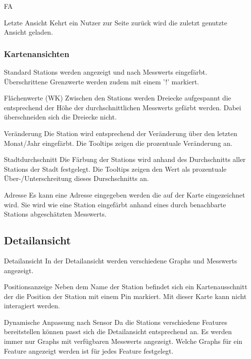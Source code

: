 \begin{Kriterien}{FA}
 \item[Letzte Ansicht]
  Kehrt ein Nutzer zur Seite zurück wird die zuletzt genutzte Ansicht geladen.

 \subsubsection*{Kartenansichten}

 \item[Standard]
  \glspl{Station} werden angezeigt und nach \glspl{Messwert} eingefärbt. 
  Überschrittene Grenzwerte werden zudem mit einem '!' markiert.

 \item[Flächenwerte (WK)]
   Zwischen den \glspl{Station} werden Dreiecke aufgespannt die entsprechend der Höhe der durchschnittlichen \glspl{Messwert} gefärbt werden.
   Dabei überschneiden sich die Dreiecke nicht.

 \item[Veränderung]
   Die \gls{Station} wird entsprechend der Veränderung über den letzten Monat/Jahr eingefärbt.
   Die \glspl{Tooltip} zeigen die prozentuale Veränderung an.

 \item[Stadtdurchschnitt]
  Die Färbung der \glspl{Station} wird anhand des Durchschnitts aller \glspl{Station} der Stadt festgelegt.
  Die \glspl{Tooltip} zeigen den Wert als prozentuale Über-/Unterschreitung dieses Durschschnitts an. 

 \item[Adresse]
   Es kann eine Adresse eingegeben werden die auf der Karte eingezeichnet wird.
   Sie wird wie eine \gls{Station} eingefärbt anhand eines durch benachbarte \glspl{Station} abgeschätzten \gls{Messwert}s.

\subsection{Detailansicht}

 \item[Detailansicht]
   In der Detailansicht werden verschiedene \glspl{Graph} und \glspl{Messwert} angezeigt. 

 \item[Positionsanzeige]
  Neben dem Name der \gls{Station} befindet sich ein Kartenausschnitt der die Position der \gls{Station} mit einem \gls{Pin} markiert.
  Mit dieser Karte kann nicht interagiert werden.

 \item[Dynamische Anpassung nach Sensor]
   Da die \glspl{Station} verschiedene \glspl{Feature} bereitstellen können passt sich die Detailansicht entsprechend an.
   Es werden immer nur \glspl{Graph} mit verfügbaren \glspl{Messwert} angezeigt.
   Welche \glspl{Graph} für ein \gls{Feature} angezeigt werden ist für jedes \gls{Feature} festgelegt.


\end{Kriterien}
